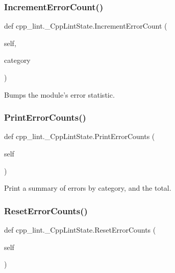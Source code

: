 \subsubsection{\texorpdfstring{Increment\+Error\+Count()}{IncrementErrorCount()}}
{\footnotesize\ttfamily def cpp\+\_\+lint.\+\_\+\+Cpp\+Lint\+State.\+Increment\+Error\+Count (\begin{DoxyParamCaption}\item[{}]{self,  }\item[{}]{category }\end{DoxyParamCaption})}

\begin{DoxyVerb}Bumps the module's error statistic.\end{DoxyVerb}
 \mbox{\label{classcpp__lint_1_1___cpp_lint_state_af4769688903eac9e7cd6de51cd1de8bf}} 
\subsubsection{\texorpdfstring{Print\+Error\+Counts()}{PrintErrorCounts()}}
{\footnotesize\ttfamily def cpp\+\_\+lint.\+\_\+\+Cpp\+Lint\+State.\+Print\+Error\+Counts (\begin{DoxyParamCaption}\item[{}]{self }\end{DoxyParamCaption})}

\begin{DoxyVerb}Print a summary of errors by category, and the total.\end{DoxyVerb}
 \mbox{\label{classcpp__lint_1_1___cpp_lint_state_aaa00731337c82f65dbb354e23ed74fcd}} 
\subsubsection{\texorpdfstring{Reset\+Error\+Counts()}{ResetErrorCounts()}}
{\footnotesize\ttfamily def cpp\+\_\+lint.\+\_\+\+Cpp\+Lint\+State.\+Reset\+Error\+Counts (\begin{DoxyParamCaption}\item[{}]{self }\end{DoxyParamCaption})}

